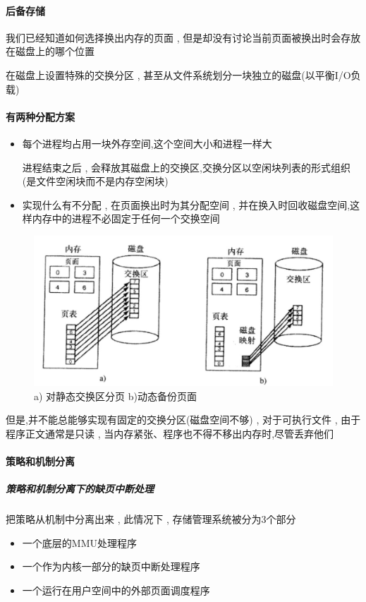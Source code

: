 \documentclass[UTF8,a4paper]{ctexart}
\begin{document}
\paragraph{后备存储}
我们已经知道如何选择换出内存的页面 , 但是却没有讨论当前页面被换出时会存放在磁盘上的哪个位置

在磁盘上设置特殊的交换分区 , 甚至从文件系统划分一块独立的磁盘(以平衡I/O负载)

\paragraph{有两种分配方案}
\begin{itemize}
	
	\item 每个进程均占用一块外存空间,这个空间大小和进程一样大
	
	进程结束之后 , 会释放其磁盘上的交换区,交换分区以空闲块列表的形式组织(是文件空闲块而不是内存空闲块)
	
	\item 实现什么有不分配 , 在页面换出时为其分配空间 , 并在换入时回收磁盘空间,这样内存中的进程不必固定于任何一个交换空间
\end{itemize}

\begin{figure}[H]
	\centering
	\includegraphics[scale = 0.4]{assets/ModernOperatingSystems/2018-01-10-23-15-08.png}
	\caption{a) 对静态交换区分页 b)动态备份页面}
\end{figure}

但是,并不能总能够实现有固定的交换分区(磁盘空间不够) , 对于可执行文件 , 由于程序正文通常是只读 , 当内存紧张、程序也不得不移出内存时,尽管丢弃他们


\paragraph{策略和机制分离}
\subparagraph{策略和机制分离下的缺页中断处理}
把策略从机制中分离出来 , 此情况下 , 存储管理系统被分为3个部分
\begin{itemize}
	\item 一个底层的MMU处理程序
	\item 一个作为内核一部分的缺页中断处理程序
	\item 一个运行在用户空间中的外部页面调度程序
\end{itemize}
\end{document}
